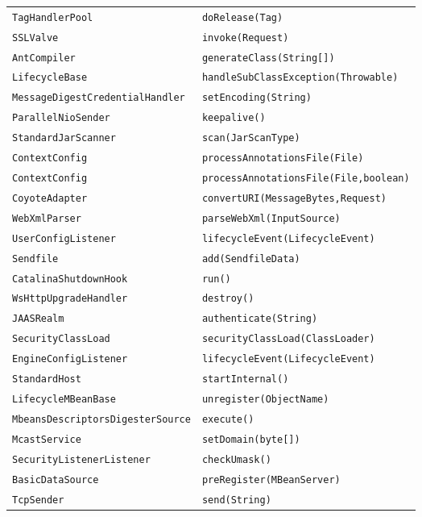 \begin{center}
\begin{longtable}{ll}
\lstinline/TagHandlerPool/&{\lstinline/doRelease(Tag)/}\\
\lstinline/SSLValve/&{\lstinline/invoke(Request)/}\\
\lstinline/AntCompiler/&{\lstinline/generateClass(String[])/}\\
\lstinline/LifecycleBase/&{\lstinline/handleSubClassException(Throwable)/}\\
\lstinline/MessageDigestCredentialHandler/&{\lstinline/setEncoding(String)/}\\
\lstinline/ParallelNioSender/&{\lstinline/keepalive()/}\\
\lstinline/StandardJarScanner/&{\lstinline/scan(JarScanType)/}\\
\lstinline/ContextConfig/&{\lstinline/processAnnotationsFile(File)/}\\
\lstinline/ContextConfig/&{\lstinline/processAnnotationsFile(File,boolean)/}\\
\lstinline/CoyoteAdapter/&{\lstinline/convertURI(MessageBytes,Request)/}\\
\lstinline/WebXmlParser/&{\lstinline/parseWebXml(InputSource)/}\\
\lstinline/UserConfigListener/&{\lstinline/lifecycleEvent(LifecycleEvent)/}\\
\lstinline/Sendfile/&{\lstinline/add(SendfileData)/}\\
\lstinline/CatalinaShutdownHook/&{\lstinline/run()/}\\
\lstinline/WsHttpUpgradeHandler/&{\lstinline/destroy()/}\\
\lstinline/JAASRealm/&{\lstinline/authenticate(String)/}\\
\lstinline/SecurityClassLoad/&{\lstinline/securityClassLoad(ClassLoader)/}\\
\lstinline/EngineConfigListener/&{\lstinline/lifecycleEvent(LifecycleEvent)/}\\
\lstinline/StandardHost/&{\lstinline/startInternal()/}\\
\lstinline/LifecycleMBeanBase/&{\lstinline/unregister(ObjectName)/}\\
\lstinline/MbeansDescriptorsDigesterSource/&{\lstinline/execute()/}\\
\lstinline/McastService/&{\lstinline/setDomain(byte[])/}\\
\lstinline/SecurityListenerListener/&{\lstinline/checkUmask()/}\\
\lstinline/BasicDataSource/&{\lstinline/preRegister(MBeanServer)/}\\
\lstinline/TcpSender/&{\lstinline/send(String)/}\\

\end{longtable}
\end{center}
